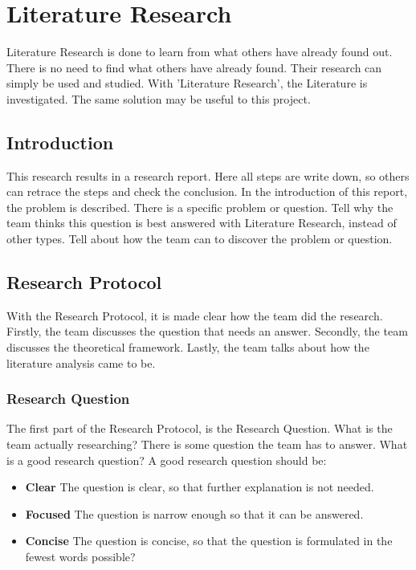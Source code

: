 \documentclass[10pt]{report}
\begin{document}
\newpage

\section{Literature Research}

Literature Research is done to learn from what others have already found out. There is no need to find what others have already found. Their research can simply be used and studied. With 'Literature Research', the Literature is investigated. The same solution may be useful to this project.

\subsection{Introduction}

This research results in a research report. Here all steps are write down, so others can retrace the steps and check the conclusion. In the introduction of this report, the problem is described. There is a specific problem or question. Tell why the team thinks this question is best answered with Literature Research, instead of other types. Tell about how the team can to discover the problem or question.

\subsection{Research Protocol}

With the Research Protocol, it is made clear how the team did the research. Firstly, the team discusses the question that needs an answer. Secondly, the team discusses the theoretical framework. Lastly, the team talks about how the literature analysis came to be.

\subsubsection{Research Question}

The first part of the Research Protocol, is the Research Question. What is the team actually researching? There is some question the team has to answer. What is a good research question? A good research question should be:

\begin{itemize}
	\item \textbf{Clear} The question is clear, so that further explanation is not needed.
	\item \textbf{Focused} The question is narrow enough so that it can be answered.
	\item \textbf{Concise} The question is concise, so that the question is formulated in the fewest words possible?
\end{itemize}
\end{document}
